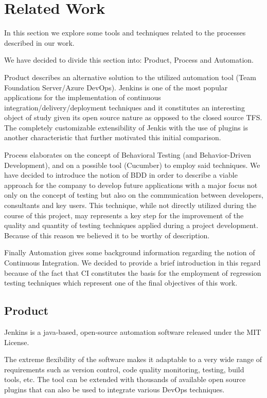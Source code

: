 \chapter{Related Work}

In this section we explore some tools and techniques related to the processes described in our work.

We have decided to divide this section into: Product, Process and Automation. 

Product describes an alternative solution to the utilized automation tool (Team Foundation Server/Azure DevOps). Jenkins is one of the most popular applications for the implementation of continuous integration/delivery/deployment techniques and it constitutes an interesting object of study given its open source nature as opposed to the closed source TFS. The completely customizable extensibility of Jenkis with the use of plugins is another characteristic that further motivated this initial comparison.

Process elaborates on the concept of Behavioral Testing (and Behavior-Driven Development), and on a possible tool (Cucumber) to employ said techniques. We have decided to introduce the notion of BDD in order to describe a viable approach for the company to develop future applications with a major focus not only on the concept of testing but also on the communication between developers, consultants and key users. This technique, while not directly utilized during the course of this project, may represents a key step for the improvement of the quality and quantity of testing techniques applied during a project development. Because of this reason we believed it to be worthy of description.

Finally Automation gives some background information regarding the notion of Continuous Integration. We decided to provide a brief introduction in this regard because of the fact that CI constitutes the basis for the employment of regression testing techniques which represent one of the final objectives of this work.

\section{Product} 

Jenkins \cite{JenkinsGuide} is a java-based, open-source automation software released under the MIT License.

The extreme flexibility of the software makes it adaptable to a very wide range of requirements such as version control, code quality monitoring, testing, build tools, etc.
The tool can be extended with thousands of available open source plugins that can also be used to integrate various DevOps techniques.

